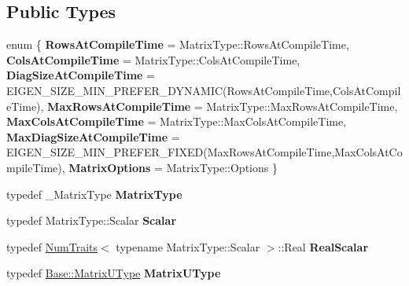 \subsection*{Public Types}
\begin{DoxyCompactItemize}
\item 
\mbox{\label{class_eigen_1_1_jacobi_s_v_d_a28d78c081c6311ac6ecd771df4b15337}} 
enum \{ \newline
{\bfseries Rows\+At\+Compile\+Time} = Matrix\+Type\+::Rows\+At\+Compile\+Time, 
{\bfseries Cols\+At\+Compile\+Time} = Matrix\+Type\+::Cols\+At\+Compile\+Time, 
{\bfseries Diag\+Size\+At\+Compile\+Time} = E\+I\+G\+E\+N\+\_\+\+S\+I\+Z\+E\+\_\+\+M\+I\+N\+\_\+\+P\+R\+E\+F\+E\+R\+\_\+\+D\+Y\+N\+A\+M\+IC(Rows\+At\+Compile\+Time,Cols\+At\+Compile\+Time), 
{\bfseries Max\+Rows\+At\+Compile\+Time} = Matrix\+Type\+::Max\+Rows\+At\+Compile\+Time, 
\newline
{\bfseries Max\+Cols\+At\+Compile\+Time} = Matrix\+Type\+::Max\+Cols\+At\+Compile\+Time, 
{\bfseries Max\+Diag\+Size\+At\+Compile\+Time} = E\+I\+G\+E\+N\+\_\+\+S\+I\+Z\+E\+\_\+\+M\+I\+N\+\_\+\+P\+R\+E\+F\+E\+R\+\_\+\+F\+I\+X\+ED(Max\+Rows\+At\+Compile\+Time,Max\+Cols\+At\+Compile\+Time), 
{\bfseries Matrix\+Options} = Matrix\+Type\+::Options
 \}
\item 
\mbox{\label{class_eigen_1_1_jacobi_s_v_d_a2b526fed1f4280249d759b09cadcfded}} 
typedef \+\_\+\+Matrix\+Type {\bfseries Matrix\+Type}
\item 
\mbox{\label{class_eigen_1_1_jacobi_s_v_d_af8aa379704163fb6ea722beb615f0862}} 
typedef Matrix\+Type\+::\+Scalar {\bfseries Scalar}
\item 
\mbox{\label{class_eigen_1_1_jacobi_s_v_d_a33c5cda5ab6ba0d06c567a05deff89e4}} 
typedef \mbox{\hyperlink{struct_eigen_1_1_num_traits}{Num\+Traits}}$<$ typename Matrix\+Type\+::\+Scalar $>$\+::Real {\bfseries Real\+Scalar}
\item 
\mbox{\label{class_eigen_1_1_jacobi_s_v_d_a8b2e5e357eb839e65cee7f4d56962906}} 
typedef \mbox{\hyperlink{class_eigen_1_1_matrix}{Base\+::\+Matrix\+U\+Type}} {\bfseries Matrix\+U\+Type}
\item 
\mbox{\label{class_eigen_1_1_jacobi_s_v_d_a08597d375e3ba00f089e1f3dd994739a}} 

\end{DoxyCompactItemize}
